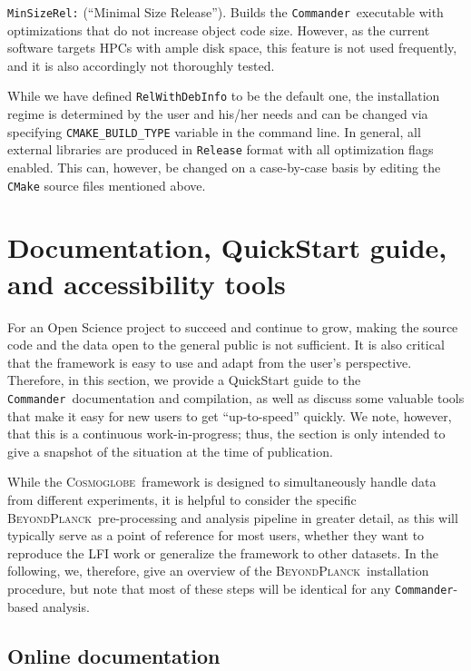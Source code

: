 \documentclass[twocolumn]{aa}
\def\commander{\texttt{Commander}}
\newcommand{\BP}{\textsc{BeyondPlanck}}
\newcommand{\cosmoglobe}{\textsc{Cosmoglobe}}
\begin{document}
\texttt{MinSizeRel:} (``Minimal Size Release''). Builds the \commander\ executable with optimizations that do not increase object code size. However, as the current software targets HPCs with ample disk space, this feature is not used frequently, and it is also accordingly not thoroughly tested.

While we have defined \texttt{RelWithDebInfo} to be the default one, the installation regime is determined by the user and his/her needs and can be changed via specifying \texttt{CMAKE\_BUILD\_TYPE} variable in the command line. In general, all external libraries are produced in  \texttt{Release} format with all optimization flags enabled. This can, however, be changed on a case-by-case basis by editing the \texttt{CMake}  source files mentioned above.


\section{Documentation, QuickStart guide, and accessibility tools}
\label{sec:bp_reproducibility}

For an Open Science project to succeed and continue to grow, making the source code and the data open to the general public is not sufficient. It is also critical that the framework is easy to use and adapt from the user’s perspective. Therefore, in this section, we provide a QuickStart guide to the \commander\ documentation and compilation, as well as discuss some valuable tools that make it easy for new users to get “up-to-speed” quickly. We note, however, that this is a continuous work-in-progress; thus, the section is only intended to give a snapshot of the situation at the time of publication.

While the \cosmoglobe\ framework is designed to simultaneously handle data from different experiments, it is helpful to consider the specific \BP\ pre-processing and analysis pipeline in greater detail, as this will typically serve as a point of reference for most users, whether they want to reproduce the LFI work or generalize the framework to other datasets. In the following, we, therefore, give an overview of the \BP\ installation procedure, but note that most of these steps will be identical for any \commander-based analysis.

\subsection{Online documentation}
\label{sec:docs}
\end{document}
